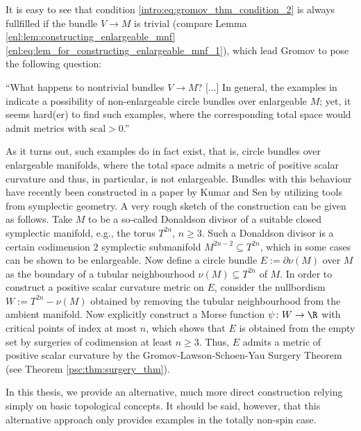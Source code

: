 It is easy to see that condition \ref{intro:eq:gromov_thm_condition_2} is always fullfilled if the bundle $V \to M$ is trivial (compare Lemma \ref{enl:lem:constructing_enlargeable_mnf} \ref{enl:eq:lem_for_constructing_enlargeable_mnf_1}), which lead Gromov to pose the following question:

\begin{question*}
``What happens to nontrivial bundles $V \to M$? [...] In general, the examples in \cite{BrunnbauerHanke} indicate a possibility of non-enlargeable circle bundles over enlargeable $M$; yet, it seems hard(er) to find such examples, where the corresponding total space would admit metrics with $\mathrm{scal} > 0$.''
\end{question*}

As it turns out, such examples do in fact exist, that is, circle bundles over enlargeable manifolds, where the total space admits a metric of positive scalar curvature and thus, in particular, is not enlargeable. Bundles with this behaviour have recently been constructed in a paper by Kumar and Sen \cite{kumar2025circle} by utilizing tools from symplectic geometry. A very rough sketch of the construction can be given as follows. Take $M$ to be a so-called Donaldson divisor of a suitable closed symplectic manifold, e.g., the torus $T^{2n}$, $n \geq 3$. Such a Donaldson divisor is a certain codimension $2$ symplectic submanifold $M^{2n-2} \subseteq T^{2n}$, which in some cases can be shown to be enlargeable. Now define a circle bundle $E := \partial \nu(M)$ over $M$ as the boundary of a tubular neighbourhood $\nu(M) \subseteq T^{2n}$ of $M$. In order to construct a positive scalar curvature metric on $E$, consider the nullbordism $W := T^{2n} - \nu(M)$ obtained by removing the tubular neighbourhood from the ambient manifold. Now explicitly construct a Morse function $\psi \colon W \to \R$ with critical points of index at most $n$, which shows that $E$ is obtained from the empty set by surgeries of codimension at least $n \geq 3$. Thus, $E$ admits a metric of positive scalar curvature by the Gromov-Lawson-Schoen-Yau Surgery Theorem (see Theorem \ref{psc:thm:surgery_thm}).

In this thesis, we provide an alternative, much more direct construction relying simply on basic topological concepts. It should be said, however, that this alternative approach only provides examples in the totally non-spin case.

\newpage

